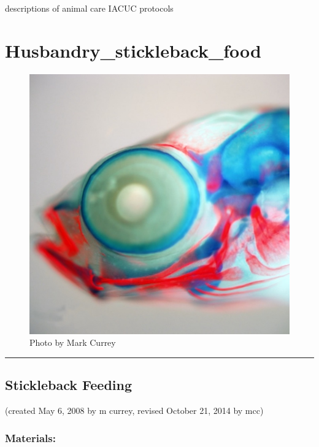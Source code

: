 \documentclass[
]{book}
\begin{document}
descriptions of animal care IACUC protocols

\hypertarget{husbandry_stickleback_food}{%
\chapter{Husbandry\_stickleback\_food}\label{husbandry_stickleback_food}}

\begin{figure}
\centering
\includegraphics{images/double_head.jpg}
\caption{Photo by Mark Currey}
\end{figure}

\begin{center}\rule{0.5\linewidth}{0.5pt}\end{center}

\hypertarget{stickleback-feeding}{%
\section{Stickleback Feeding}\label{stickleback-feeding}}

(created May 6, 2008 by m currey, revised October 21, 2014 by mcc)

\hypertarget{materials}{%
\subsection{Materials:}\label{materials}}
\end{document}
